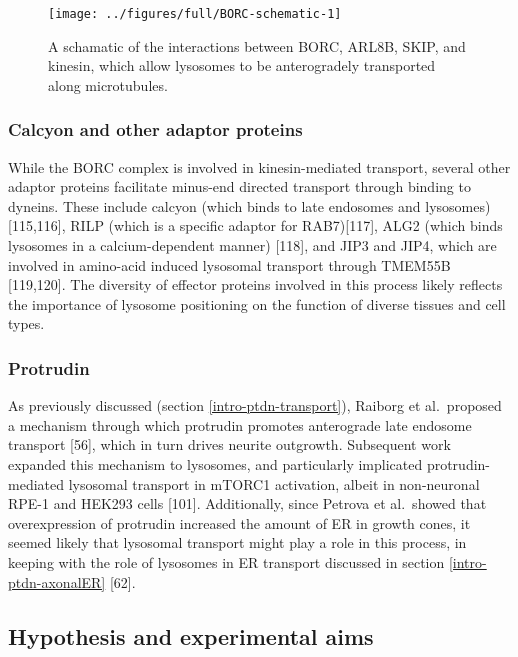 \documentclass[
  12pt,
  a4paper,
]{book}
\begin{document}
\vspace{30pt}
\begin{figure}
\texttt{[image: ../figures/full/BORC-schematic-1]} \caption[BORC schematic]{A schamatic of the interactions between BORC, ARL8B, SKIP, and kinesin, which allow lysosomes to be anterogradely transported along microtubules.}\label{fig:BORC-schematic}
\end{figure}

\hypertarget{calcyon-and-other-adaptor-proteins}{%
\subsubsection{Calcyon and other adaptor proteins}\label{calcyon-and-other-adaptor-proteins}}

While the BORC complex is involved in kinesin-mediated transport, several other adaptor proteins facilitate minus-end directed transport through binding to dyneins. These include calcyon (which binds to late endosomes and lysosomes) {[}115,116{]}, RILP (which is a specific adaptor for RAB7){[}117{]}, ALG2 (which binds lysosomes in a calcium-dependent manner) {[}118{]}, and JIP3 and JIP4, which are involved in amino-acid induced lysosomal transport through TMEM55B {[}119,120{]}. The diversity of effector proteins involved in this process likely reflects the importance of lysosome positioning on the function of diverse tissues and cell types.

\hypertarget{protrudin}{%
\subsubsection{Protrudin}\label{protrudin}}

As previously discussed (section \ref{intro-ptdn-transport}), Raiborg et al.~proposed a mechanism through which protrudin promotes anterograde late endosome transport {[}56{]}, which in turn drives neurite outgrowth. Subsequent work expanded this mechanism to lysosomes, and particularly implicated protrudin-mediated lysosomal transport in mTORC1 activation, albeit in non-neuronal RPE-1 and HEK293 cells {[}101{]}. Additionally, since Petrova et al.~showed that overexpression of protrudin increased the amount of ER in growth cones, it seemed likely that lysosomal transport might play a role in this process, in keeping with the role of lysosomes in ER transport discussed in section \ref{intro-ptdn-axonalER} {[}62{]}.

\hypertarget{hypothesis-and-experimental-aims}{%
\subsection{Hypothesis and experimental aims}\label{hypothesis-and-experimental-aims}}
\end{document}
